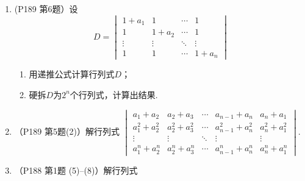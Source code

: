 \begin{enumerate}
    \item (P189 第6题）设
    \[ D=\begin{vmatrix}
        1+a_1&1&\cdots&1\\
        1&1+a_2&\cdots&1\\
        \vdots&\vdots&\ddots&\vdots\\
        1&1&\cdots&1+a_n
    \end{vmatrix} \]
    \begin{enumerate}[label=(\arabic*)]
        \item 用递推公式计算行列式$D$；
        \item 硬拆$D$为$2^n$个行列式，计算出结果.
    \end{enumerate}

    \item （P189 第5题(2)）解行列式 $\begin{vmatrix}
        a_{1}+a_{2} & a_{2}+a_{3} & \cdots & a_{n-1}+a_n & a_n+a_{1} \\
        a_{1}^{2}+a_{2}^{2} & a_{2}^{2}+a_{3}^{2} & \cdots & a_{n-1}^{2}+a_n^{2} & a_n^{2}+a_{1}^{2} \\
        \vdots & \vdots & \ddots & \vdots & \vdots \\
        a_{1}^{n}+a_{2}^{n} & a_{2}^{n}+a_{3}^{n} & \cdots & a_{n-1}^{n}+a_n^{n} & a_n^{n}+a_{1}^{n}
    \end{vmatrix}$.

    \item （P188 第1题 (5)--(8)）解行列式
    \begin{enumerate}[label=(\arabic*)]  \begin{multicols}{2} %


\end{multicols}
\end{enumerate}
\end{enumerate}
